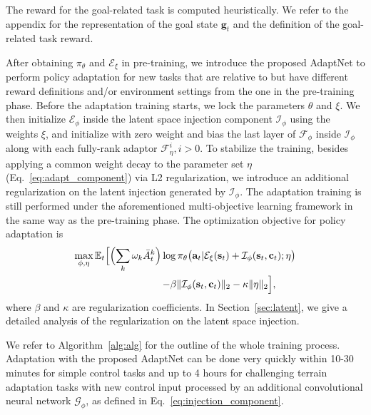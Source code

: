 \noindent The reward for the goal-related task is computed heuristically. We refer to the appendix %
for the representation of the goal state $\mathbf{g}_t$ and the definition of the goal-related task reward.

After obtaining $\pi_\theta$ and $\mathcal{E}_\xi$ %
in pre-training,
we introduce the proposed AdaptNet to perform policy adaptation for new tasks that are relative to but have different reward definitions and/or environment settings from the one in the pre-training phase. 
Before the adaptation training starts, we lock the parameters $\theta$ and $\xi$. We then initialize $\mathcal{E}_\phi$ inside the latent space injection component $\mathcal{I}_\phi$  using the %
weights $\xi$, and initialize with zero weight and bias 
the last layer of $\mathcal{F}_\phi$ inside $\mathcal{I}_\phi$ along with each fully-rank adaptor $\mathcal{F}_\eta^i, i>0$. %
To stabilize the training, 
besides applying a common weight decay to the parameter set $\eta$ (Eq.~\ref{eq:adapt_component}) via L2 regularization,
we introduce an additional regularization on the latent injection generated by $\mathcal{I}_\phi$.
The adaptation training is still performed under the aforementioned multi-objective learning framework in the same way as the pre-training phase.
The optimization objective for policy adaptation is
\begin{equation}\label{eq:loss_adapt}\begin{split}
    \max_{\phi, \eta} \mathbb{E}_t \Bigl[
    \Bigl(\sum_k \omega_k \bar{A}_t^k\Bigr)
    \log\pi_\theta\bigl(\mathbf{a}_t \vert \mathcal{E}_\xi(\mathbf{s}_t) + \mathcal{I}_\phi(\mathbf{s}_t, \mathbf{c}_t); \eta\bigr) \\
    - \beta \| \mathcal{I}_\phi(\mathbf{s}_t, \mathbf{c}_t)\|_2 - \kappa \| \eta \|_2 \Bigr], \qquad
\end{split}\end{equation}
where $\beta$ and $\kappa$ are regularization coefficients.
In Section~\ref{sec:latent}, we give a detailed analysis of the regularization on the latent space injection. 

We refer to Algorithm~\ref{alg:alg} for the outline of the whole training process. %
Adaptation with the proposed AdaptNet can be done very quickly within 10-30 minutes for simple control tasks and up to 4 hours for %
challenging terrain adaptation tasks with  new control input processed by an additional convolutional neural network $\mathcal{G}_\phi$, as defined in Eq.~\ref{eq:injection_component}. 




